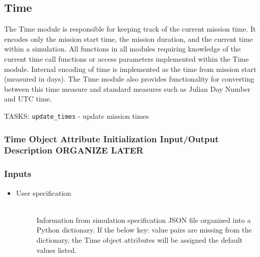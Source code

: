 \documentclass[cleanfoot]{asme2ej}
\begin{document}

\subsection{Time} 
The Time module is responsible for keeping track of the current mission time.  It encodes only the mission start time, the mission duration, and the current time within a simulation.  All functions in all modules requiring knowledge of the current time call functions or access parameters implemented within the Time module.  Internal encoding of time is implemented as the time from mission start (measured in days).  The Time module also provides functionality for converting between this time measure and standard measures such as Julian Day Number and UTC time.

TASKS: \verb+update_times+ - update mission times

\label{sec:time}
\subsubsection{Time Object Attribute Initialization Input/Output Description ORGANIZE LATER}

\subsubsection*{Inputs}
\begin{itemize}
    \item
    \begin{description}
        \item[User specification] \hfill \\
        Information from simulation specification JSON file organized into a Python dictionary. If the below key: value pairs are missing from the dictionary, the Time object attributes will be assigned the default values listed.
    \end{description}
\end{itemize}
\end{document}
